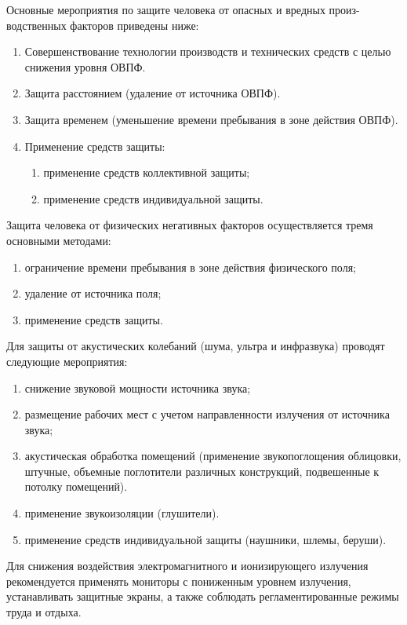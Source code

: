 Основные мероприятия по защите человека от опасных и вредных произ-водственных факторов приведены ниже:

\begin{enumerate}[1.]
	\item Совершенствование технологии производств и технических средств с целью снижения уровня ОВПФ.
	\item Защита расстоянием (удаление от источника ОВПФ).
	\item Защита временем (уменьшение времени пребывания в зоне действия ОВПФ).
	\item Применение средств защиты:
	\begin{enumerate}
		\item применение средств коллективной защиты;
		\item применение средств индивидуальной защиты.
	\end{enumerate}
\end{enumerate}

Защита человека от физических негативных факторов осуществляется тремя основными методами:

\begin{enumerate}
	\item ограничение времени пребывания в зоне действия физического поля;
	\item удаление от источника поля;
	\item применение средств защиты.
\end{enumerate}

Для защиты от акустических колебаний (шума, ультра и инфразвука) проводят следующие мероприятия:

\begin{enumerate}
	\item снижение звуковой мощности источника звука;
	\item размещение рабочих мест с учетом направленности излучения от источника звука;
	\item акустическая обработка помещений (применение звукопоглощения облицовки, штучные, объемные поглотители различных конструкций, подвешенные к потолку помещений).
	\item применение звукоизоляции (глушители).
	\item применение средств индивидуальной защиты (наушники, шлемы, беруши).
\end{enumerate}

Для снижения воздействия электромагнитного и ионизирующего излучения рекомендуется применять мониторы с пониженным уровнем излучения, устанавливать защитные экраны, а также соблюдать регламентированные режимы труда и отдыха.

